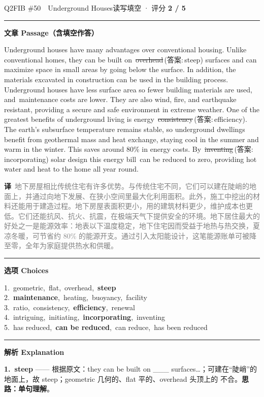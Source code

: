\documentclass[11pt]{article}
\newcommand{\ptesub}[1]{%
  \par\needspace{2\baselineskip}\smallskip
  {\color{cAccent}\rule[-0.2ex]{3pt}{1.05em}}\hspace{6pt}%
  {\bfseries\color{cHead}#1}\par\nopagebreak\smallskip}
\newcommand{\zh}[1]{{\footnotesize\textcolor{cNote}{\textbf{译}}\ \textcolor{gray}{#1}}}
\newcommand{\rok}[1]{{\color{cFix}\ding{51}\,#1}}                 %
\newcommand{\rno}[2]{{\color{cWrong}\ding{55}\,\sout{#1}}\,{\footnotesize\color{cFix}(答案:\,#2)}}  %
\begin{document}
\begin{qblock}{Q2\quad FIB \#50\ \ Underground Houses}{读写填空 · 评分 \textcolor{cAccent}{\bfseries 2 / 5}}
\ptesub{文章 Passage（含填空作答）}
\begin{promptbox}
Underground houses have many advantages over conventional housing. Unlike conventional homes, they can be built on \rno{overhead}{steep} surfaces and can maximize space in small areas by going below the surface. In addition, the materials excavated in construction can be used in the building process. Underground houses have less surface area so fewer building materials are used, and \rok{maintenance} costs are lower. They are also wind, fire, and earthquake resistant, providing a secure and safe environment in extreme weather. One of the greatest benefits of underground living is energy \rno{consistency}{efficiency}. The earth's subsurface temperature remains stable, so underground dwellings benefit from geothermal mass and heat exchange, staying cool in the summer and warm in the winter. This saves around 80\% in energy costs. By \rno{inventing}{incorporating} solar design this energy bill \rok{can be reduced} to zero, providing hot water and heat to the home all year round.
\end{promptbox}
\zh{地下房屋相比传统住宅有许多优势。与传统住宅不同，它们可以建在陡峭的地面上，并通过向地下发展、在狭小空间里最大化利用面积。此外，施工中挖出的材料还能用于建造过程。地下房屋表面积更小，用的建筑材料更少，维护成本也更低。它们还能抗风、抗火、抗震，在极端天气下提供安全的环境。地下居住最大的好处之一是能源效率：地表以下温度稳定，地下住宅因而受益于地热与热交换，夏凉冬暖，可节省约 80\% 的能源开支。通过引入太阳能设计，这笔能源账单可被降至零，全年为家庭提供热水和供暖。}
\ptesub{选项 Choices}
{\small
1.\ geometric,\ flat,\ overhead,\ \textbf{steep}\\
2.\ \textbf{maintenance},\ heating,\ buoyancy,\ facility\\
3.\ ratio,\ consistency,\ \textbf{efficiency},\ renewal\\
4.\ intriguing,\ initiating,\ \textbf{incorporating},\ inventing\\
5.\ has reduced,\ \textbf{can be reduced},\ can reduce,\ has been reduced}
\ptesub{解析 Explanation}
\begin{notebox}\footnotesize
\textbf{1.\ steep} —— 根据原文：they can be built on \_\_\_ surfaces…；可建在“陡峭”的地面上，故 steep；geometric 几何的、flat 平的、overhead 头顶上的 不合。\textbf{思路：单句理解}。\\[2pt]

\end{notebox}
\end{qblock}
\end{document}
